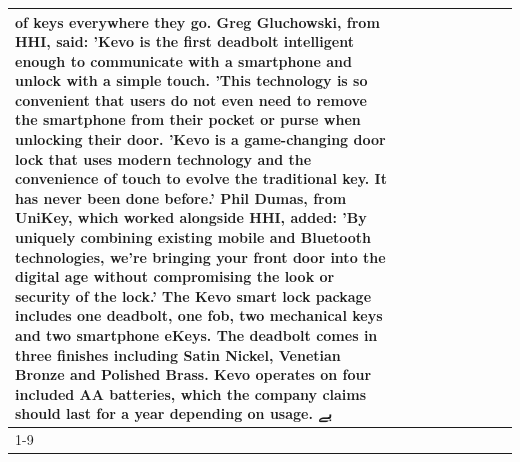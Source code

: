 \begin{table}[H]
\begin{tabular}{lllrlllll}
of keys everywhere they go. Greg Gluchowski, from HHI, said: 'Kevo is the first deadbolt intelligent enough to communicate with a smartphone and unlock with a simple touch. 'This technology is so convenient that users do not even need to remove the smartphone from their pocket or purse when unlocking their door. 'Kevo is a game-changing door lock that uses modern technology and the convenience of touch to evolve the traditional key. It has never been done before.' Phil Dumas, from UniKey, which worked alongside HHI, added: 'By uniquely combining existing mobile and Bluetooth technologies, we’re bringing your front door into the digital age without compromising the look or security of the lock.' The Kevo smart lock package includes one deadbolt, one fob, two mechanical keys and two smartphone eKeys. The deadbolt comes in three finishes including Satin Nickel, Venetian Bronze and Polished Brass. Kevo operates on four included AA batteries, which the company claims should last for a year depending on usage. بے \\
\cline{1-9}

\end{tabular}
\end{table}
